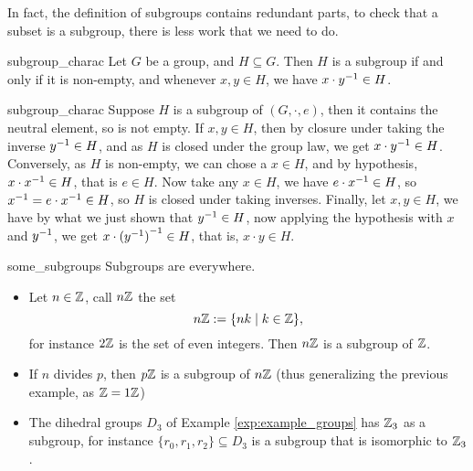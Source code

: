 In fact, the definition of subgroups contains redundant parts, to check that a subset is a subgroup, there is less work that we need to do.
\begin{clem}{}{subgroup_charac}
    Let \( G \) be a group, and \( H \subseteq G \). Then \( H \) is a subgroup if and only if it is non-empty, and whenever \( x, y \in H \), we have \( x\cdot{y}^{-1} \in H \). 
\end{clem}
\begin{lemproof}{subgroup_charac}
    Suppose \( H \) is a subgroup of \( (G, \cdot, e) \), then it contains the neutral element, so is not empty. If \( x, y \in H \), then by closure under taking the inverse \(  {y}^{-1} \in H \), and as \( H \) is closed under the group law, we get \( x \cdot {y}^{-1} \in H \). Conversely, as \( H \) is non-empty, we can chose a \( x \in H \), and by hypothesis, \( x \cdot {x}^{-1} \in H \), that is \( e \in H \). Now take any \( x \in H \), we have \( e \cdot {x}^{-1} \in H \), so \( {x}^{-1} = e \cdot {x}^{-1} \in H \), so \( H \) is closed under taking inverses. Finally, let \( x, y \in H \), we have by what we just shown that \( {y}^{-1} \in H \), now applying the hypothesis with \( x \) and \( {y}^{-1} \), we get \( x \cdot {({y}^{-1})}^{-1} \in H \), that is, \( x \cdot y \in H \).
\end{lemproof}

\begin{cexp}{}{some_subgroups}
    Subgroups are everywhere. 
    \begin{itemize}
        \item Let \( n \in \mathbb{Z} \), call \( n\mathbb{Z} \) the set
        \begin{equation*}
            n \mathbb{Z} := \{ nk \mid k \in \mathbb{Z} \},    
        \end{equation*}
        for instance \( 2\mathbb{Z} \) is the set of even integers. Then \( n\mathbb{Z} \) is a subgroup of \( \mathbb{Z} \).
        \item If \( n \) divides \( p \), then \( p\mathbb{Z} \) is a subgroup of \( n\mathbb{Z} \) (thus generalizing the previous example, as \( \mathbb{Z} = 1\mathbb{Z} \))
        \item The dihedral groups \( D_3 \) of Example \ref{exp:example_groups} has \( \mathbb{Z}_3 \) as a subgroup, for instance \( \{ r_0, r_1, r_2 \} \subseteq D_3 \) is a subgroup that is isomorphic to \( \mathbb{Z}_3 \).
    \end{itemize}

\end{cexp}

